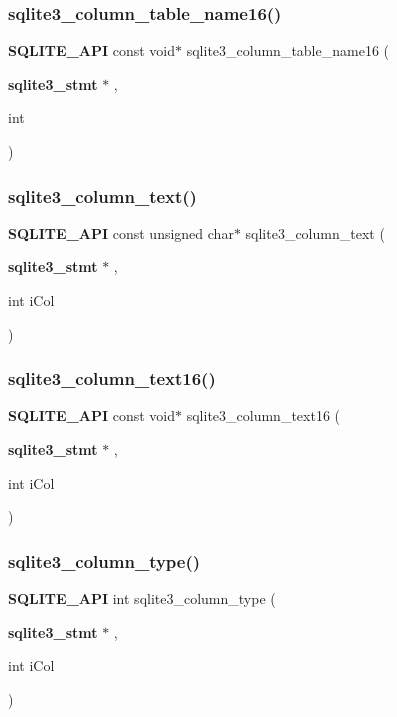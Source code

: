 \subsubsection{sqlite3\_column\_table\_name16()}
{\footnotesize\ttfamily \textbf{ S\+Q\+L\+I\+T\+E\+\_\+\+A\+PI} const void$\ast$ sqlite3\+\_\+column\+\_\+table\+\_\+name16 (\begin{DoxyParamCaption}\item[{\textbf{ sqlite3\+\_\+stmt} $\ast$}]{,  }\item[{int}]{ }\end{DoxyParamCaption})}

\mbox{\label{sqlite3_8h_a2f04c4c4fcf17f6e866236cce8c0d426}} 
\subsubsection{sqlite3\_column\_text()}
{\footnotesize\ttfamily \textbf{ S\+Q\+L\+I\+T\+E\+\_\+\+A\+PI} const unsigned char$\ast$ sqlite3\+\_\+column\+\_\+text (\begin{DoxyParamCaption}\item[{\textbf{ sqlite3\+\_\+stmt} $\ast$}]{,  }\item[{int}]{i\+Col }\end{DoxyParamCaption})}

\mbox{\label{sqlite3_8h_acd2186d1b5bf3662be539d0763dd3eb9}} 
\subsubsection{sqlite3\_column\_text16()}
{\footnotesize\ttfamily \textbf{ S\+Q\+L\+I\+T\+E\+\_\+\+A\+PI} const void$\ast$ sqlite3\+\_\+column\+\_\+text16 (\begin{DoxyParamCaption}\item[{\textbf{ sqlite3\+\_\+stmt} $\ast$}]{,  }\item[{int}]{i\+Col }\end{DoxyParamCaption})}

\mbox{\label{sqlite3_8h_a384086b220821bc71e9a3f900773a25d}} 
\subsubsection{sqlite3\_column\_type()}
{\footnotesize\ttfamily \textbf{ S\+Q\+L\+I\+T\+E\+\_\+\+A\+PI} int sqlite3\+\_\+column\+\_\+type (\begin{DoxyParamCaption}\item[{\textbf{ sqlite3\+\_\+stmt} $\ast$}]{,  }\item[{int}]{i\+Col }\end{DoxyParamCaption})}

